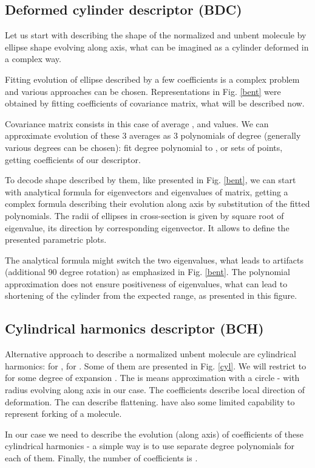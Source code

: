 \documentclass[10pt,journal]{IEEEtranTCOM}
\theoremstyle{plain}
\begin{document}
\subsection{Deformed cylinder descriptor (BDC)}
Let us start with describing the shape of the normalized and unbent molecule by ellipse shape evolving along  axis, what can be imagined as a cylinder deformed in a complex way.

Fitting evolution of ellipse described by a few coefficients is a complex problem and various approaches can be chosen. Representations in Fig. \ref{bent} were obtained by fitting coefficients of  covariance matrix, what will be described now.

Covariance matrix consists in this case of average ,  and  values. We can approximate evolution of these 3 averages as 3 polynomials of degree  (generally various degrees can be chosen): fit degree  polynomial to ,  or  sets of points, getting  coefficients of our descriptor.

To decode shape described by them, like presented in Fig. \ref{bent}, we can start with analytical formula for eigenvectors and eigenvalues of  matrix, getting a complex formula describing their evolution along  axis by substitution of the fitted polynomials. The radii of ellipses in cross-section is given by square root of eigenvalue, its direction by corresponding eigenvector. It allows to define the presented parametric plots.

The analytical formula might switch the two eigenvalues, what leads to artifacts (additional 90 degree rotation) as emphasized in Fig. \ref{bent}. The polynomial approximation does not ensure positiveness of eigenvalues, what can lead to shortening of the cylinder from the expected  range, as presented in this figure.
\subsection{Cylindrical harmonics descriptor (BCH)}
Alternative approach to describe a normalized unbent molecule are cylindrical harmonics:  for ,  for . Some of them are presented in Fig. \ref{cyl}. We will restrict to 
for some degree of expansion . The  is means approximation with a circle - with radius evolving along  axis in our case. The  coefficients describe local direction of deformation. The  can describe flattening.  have also some limited capability to represent forking of a molecule.

In our case we need to describe the evolution (along  axis) of coefficients of these cylindrical harmonics - a simple way is to use separate degree  polynomials for each of them. Finally, the number of coefficients is .
\end{document}
